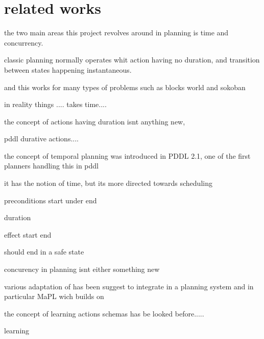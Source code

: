 \section{related works}

the two main areas this project revolves around in planning is time and concurrency. 



classic planning normally operates whit action having no duration, and transition between states happening instantaneous.

and this works for many types of problems such as blocks world and sokoban


in reality things .... takes time.... 

the concept of actions having duration isnt anything new,


pddl durative actions....

the concept of temporal planning was introduced in PDDL 2.1, one of the first planners handling this in pddl \cite{durative}

it has the notion of time, but its more directed towards scheduling

preconditions
	start
	under
	end
	
duration

effect
	start
	end
	
	
should end in a safe state




concurency in planning isnt either something new

various adaptation of has been suggest to integrate in a planning system
and in particular MaPL wich builds on





the concept of learning actions schemas has be looked before.....

learning \cite{Action-Schemas} \cite{jacobsen2015a}
\cite{mapl}